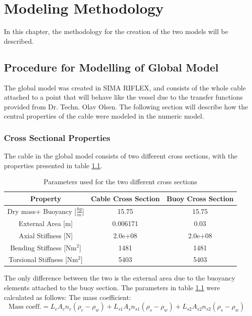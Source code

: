 \chapter{Modeling Methodology}
\label{chap:procedure}
In this chapter, the methodology for the creation of the two models will be described.
\section{Procedure for Modelling of Global Model}
\label{sec:globmod}
The global model was created in SIMA RIFLEX, and consists of the whole cable attached to a point that will behave like the vessel due to the transfer functions provided from Dr. Techn. Olav Olsen. The following section will describe how the central properties of the cable were modeled in the numeric model. 

\subsection{Cross Sectional Properties}
The cable in the global model consists of two different cross sections, with the properties presented in table \ref{table:crosssima}. 
\begin{table} [H]
\centering
\begin{tabular}{ |c|c|c|}
\hline
Property& Cable Cross Section & Buoy Cross Section \\
 \hline
 \hline
Dry mass+ Buoyancy [$\frac{kg}{m}$] & 15.75 & 15.75\\
External Area [m]& 0.006171 & 0.03\\
Axial Stiffness [N] & 2.0e+08 & 2.0e+08\\
Bending Stiffness [Nm$^2$] & 1481 & 1481\\
Torsional Stiffness [Nm$^2$] & 5403 & 5403\\
 \hline
\end{tabular}
\caption{Parameters used for the two different cross sections}
\label{table:crosssima}
\end{table}
\noindent The only difference between the two is the external area due to the buoyancy elements attached to the buoy section. The parameters in table \ref{table:crosssima} were calculated as follows:\newline
\newline 
\noindent The mass coefficient: 
\begin{equation}
\text{Mass coeff.}=L_{c} A_cn_c (\rho_c-\rho_w) + L_{s1} A_{s}n_{s1} (\rho_s-\rho_w)+L_{s2} A_{s2}n_{s2} (\rho_s-\rho_w)
\end{equation}

